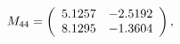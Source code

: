 \begin{equation}
M_{44}=
\left(
\begin{array}{c c}
5.1257&
-2.5192\\
8.1295&
-1.3604\\
\end{array}
\right),
\end{equation}


